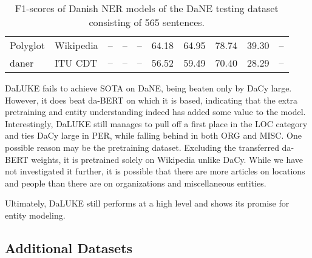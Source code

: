 \documentclass[main.tex]{subfiles}
\begin{document}
\begin{table}[H]
\begin{center}
\begin{tabular}{l l | c c c c | c c c c}
                        Polyglot      & Wikipedia & --             & --             & --             & 64.18                        & 64.95          & 78.74          & 39.30          & -- \\
                        daner         & ITU CDT   & --             & --             & --             & 56.52                        & 59.49          & 70.40          & 28.29          & -- \\
                \end{tabular}
        \end{center}
        \caption{F1\pro-scores of Danish NER models of the DaNE testing dataset consisting of 565 sentences.}
        \label{tab:DaNE}
\end{table}\noindent
DaLUKE fails to achieve SOTA on DaNE, being beaten only by DaCy large.
However, it does beat da-BERT on which it is based, indicating that the extra pretraining and entity understanding indeed has added some value to the model.
Interestingly, DaLUKE still manages to pull off a first place in the LOC category and ties DaCy large in PER, while falling behind in both ORG and MISC.
One possible reason may be the pretraining dataset.
Excluding the transferred da-BERT weights, it is pretrained solely on Wikipedia unlike DaCy.
While we have not investigated it further, it is possible that there are more articles on locations and people than there are on organizations and miscellaneous entities.

Ultimately, DaLUKE still performs at a high level and shows its promise for entity modeling.

\subsection{Additional Datasets}



\end{document}
